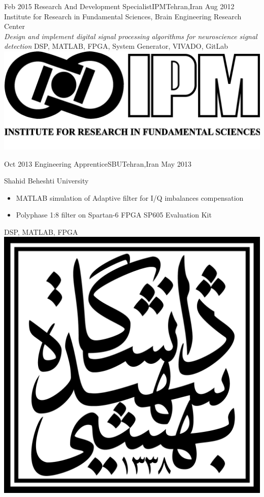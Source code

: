 \begin{experiences}
  \experience
  {Feb 2015} {Research And Development Specialist}{IPM}{Tehran,Iran}
  {Aug 2012} {
    Institute for Research in Fundamental Sciences, Brain Engineering Research Center\\
    \emph{Design and implement digital signal processing algorithms for neuroscience signal detection}
  }
  {DSP, MATLAB, FPGA, System Generator, VIVADO, GitLab}
  {\includegraphics[scale=0.025]{graphics/IPM_logo}}

  \emptySeparator

  \experience
  {Oct 2013} {Engineering Apprentice}{SBU}{Tehran,Iran}
  {May 2013} {
    Shahid Beheshti University
    \begin{itemize}
      \item MATLAB simulation of Adaptive filter for I/Q imbalances compensation
      \item Polyphase 1:8 filter on Spartan-6 FPGA SP605 Evaluation Kit
    \end{itemize}
  }
  {DSP, MATLAB, FPGA}
  {\includegraphics[scale=0.05]{graphics/SBU_logo}}


\end{experiences}

